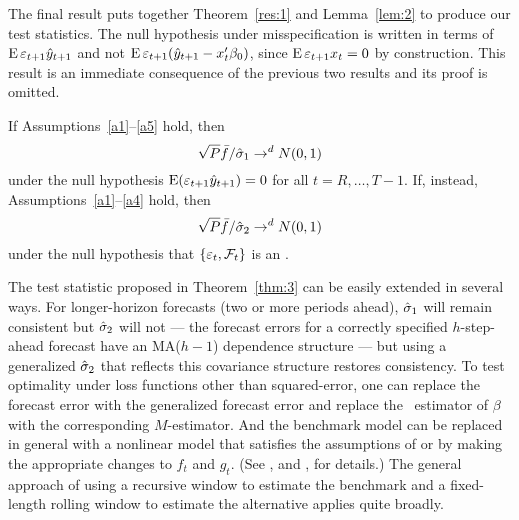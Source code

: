 The final result puts together Theorem~\ref{res:1} and
Lemma~\ref{lem:2} to produce our test statistics. The null hypothesis
under misspecification is written in terms of $\operatorname{E} \varepsilon_{t+1} \hat{y}_{t+1}$
and not $\E \ep_{t+1} (\yh_{t+1} - x_t'\btrue)$, since $\operatorname{E} \varepsilon_{t+1}
x_t = 0$ by construction. This result is an immediate consequence of
the previous two results and its proof is omitted.

{}
\begin{thm}\label{thm:3}
  If Assumptions~\ref{a1}--\ref{a5} hold, then
  \begin{equation*}
    \sqrt{P} \bar{f} / \hat\sigma_1 \to^d N(0, 1)
  \end{equation*}
  under the null hypothesis $\operatorname{E}(\varepsilon_{t+1} \hat{y}_{t+1}) = 0$ for
  all $t = R,\dots,T-1$.  If, instead, Assumptions~\ref{a1}--\ref{a4}
  hold, then
  \begin{equation*}
    \sqrt{P} \bar{f} / \hat\sigma_2 \to^d N(0, 1)
  \end{equation*}
  under the null hypothesis that $\{\varepsilon_t, \mathcal{F}_t\}$ is an \mds.
\end{thm}

The test statistic proposed in Theorem~\ref{thm:3} can be easily
extended in several ways. For longer-horizon forecasts (two or more
periods ahead), $\hat\sigma_1$ will remain consistent but $\hat\sigma_2$
will not --- the forecast errors for a correctly specified
$h$-step-ahead forecast have an MA($h-1$) dependence structure --- but
using a generalized $\hat\sigma_2$ that reflects this covariance
structure restores consistency. To test optimality under loss
functions other than squared-error, one can replace the forecast error
with the generalized forecast error \citep[see, for
example][]{PaT:07,PaT:07b} and replace the \ols\ estimator of $\beta$ with the
corresponding $M$-estimator. And the benchmark model can be replaced
in general with a nonlinear model that satisfies the assumptions of
\citet{Wes:96} or \citet{Mcc:00} by making the appropriate changes to
$f_t$ and $g_t$. (See \citealp{Wes:96}, and \citealp{Mcc:00},
for details.) The general approach of using a recursive window to
estimate the benchmark and a fixed-length rolling window to estimate
the alternative applies quite broadly.

